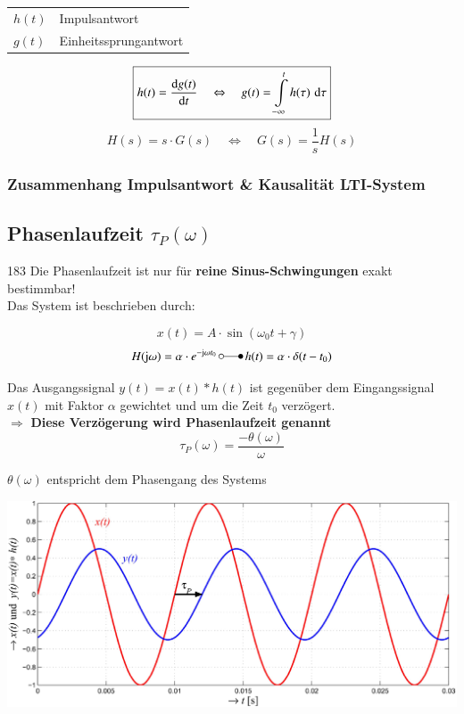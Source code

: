 \begin{tabular}{ll}
    $h(t)$ & Impulsantwort \\
    $g(t)$ & Einheitssprungantwort
\end{tabular}

$$ \boxed{ h(t) =  \frac{\mathop{} \! \mathrm{d} g(t)}{\mathop{} \! \mathrm{d} t}  \quad \Leftrightarrow \quad g(t) = \int\limits_{-\infty}^t  h(\tau) \, \mathop{} \! \mathrm{d} \tau }  $$
$$ \boxed{ H(s) = s \cdot G(s) \quad \Leftrightarrow \quad G(s) =  \frac{1}{s} H(s) }  $$


\subsubsection{Zusammenhang Impulsantwort \& Kausalität LTI-System}



\subsection{Phasenlaufzeit \texorpdfstring{$\tau_P(\omega)$}{tP(w)}}{183}
Die Phasenlaufzeit ist nur für \textbf{reine Sinus-Schwingungen} exakt bestimmbar! \\
Das System ist beschrieben durch:

$$ x(t) = A \cdot \sin(\omega_0 t + \gamma) $$
$$ H( \jimg \omega) = \alpha \cdot e^{- \jimg  \omega t_0} \, \laplace \, h(t) = \alpha \cdot \delta(t - t_0) $$


Das Ausgangssignal $y(t) = x(t) * h(t)$ ist gegenüber dem Eingangssignal $x(t)$ mit Faktor $\alpha$ gewichtet und 
um die Zeit $t_0$ verzögert. \\
$\Rightarrow$ \textbf{Diese Verzögerung wird Phasenlaufzeit genannt}
$$ \boxed{ \tau_P(\omega) = \frac{- \theta(\omega)}{\omega} } $$

$ \theta(\omega)$ entspricht dem Phasengang des Systems 



\includegraphics[width=0.8\linewidth]{images/phasenlaufzeit.png}



